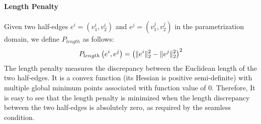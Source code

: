 \paragraph{Length Penalty}
Given two half-edges $e^i = \left(v^i_1,v^i_2\right)$ and $e^j = \left(v^j_1,v^j_2\right)$ in the parametrization domain, we define $P_{length}$ as follows:
\begin{equation}\label{length_penalty}
\begin{split}
P_{length}\left(e^i,e^j\right) = \left(\lVert e^i\rVert_2^2 - \lVert e^j\rVert_2^2\right)^2
\end{split}
\end{equation}
The length penalty measures the discrepancy between the Euclidean length of the two half-edges. It is a convex function (its Hessian is positive semi-definite) with multiple global minimum points associated with function value of $0$. Therefore, It is easy to see that the length penalty is minimized when the length discrepancy between the two half-edges is absolutely zero, as required by the seamless condition.
